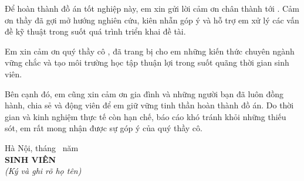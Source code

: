 Để hoàn thành đồ án tốt nghiệp này, em xin gửi lời cảm ơn chân thành tới \TenGiangVien{}. Cảm ơn thầy đã gợi mở hướng nghiên cứu, kiên nhẫn góp ý và hỗ trợ em xử lý các vấn đề kỹ thuật trong suốt quá trình triển khai đề tài.

Em xin cảm ơn quý thầy cô \TenKhoa, \TenHocVien{} đã trang bị cho em những kiến thức chuyên ngành vững chắc và tạo môi trường học tập thuận lợi trong suốt quãng thời gian sinh viên.

Bên cạnh đó, em cũng xin cảm ơn gia đình và những người bạn đã luôn đồng hành, chia sẻ và động viên để em giữ vững tinh thần hoàn thành đồ án. Do thời gian và kinh nghiệm thực tế còn hạn chế, báo cáo khó tránh khỏi những thiếu sót, em rất mong nhận được sự góp ý của quý thầy cô.

\vspace{18mm}
\begin{flushright}
Hà Nội, tháng \ThangBaoVe\ năm \NamBaoVe\\[4mm]
\textbf{SINH VIÊN}\\
\textit{(Ký và ghi rõ họ tên)}\\[22mm]
\TenSinhVien
\end{flushright}
